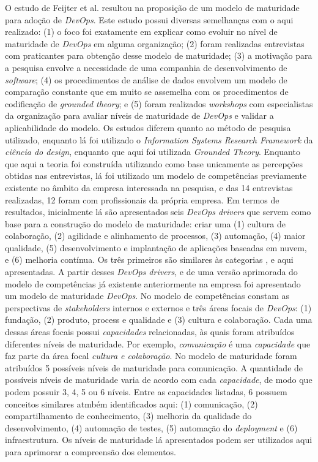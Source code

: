 O estudo de Feijter et al. \cite{feijter2017towards} resultou na proposição de
um modelo de maturidade para adoção de {\it DevOps}. Este estudo possui diversas
semelhanças com o aqui realizado: (1) o foco foi exatamente em explicar como evoluir
no nível de maturidade de {\it DevOps} em alguma organização; (2) foram realizadas
entrevistas com praticantes para obtenção desse modelo de maturidade; (3) a motivação
para a pesquisa envolve a necessidade de uma companhia de desenvolvimento de
{\it software}; (4) os procedimentos de análise de dados envolvem um modelo de
comparação constante que em muito se assemelha com os procedimentos de codificação
de {\it grounded theory}; e (5) foram realizados {\it workshops} com especialistas
da organização para avaliar níveis de maturidade de {\it DevOps} e validar
a aplicabilidade do modelo. Os estudos diferem quanto ao método de pesquisa
utilizado, enquanto lá foi utilizado o {\it Information Systems Research
Framework} da \emph{ciência do design}, enquanto que aqui foi utilizada
{\it Grounded Theory}. Enquanto que aqui a teoria foi construída utilizando
como base unicamente as percepções obtidas nas entrevistas, lá foi utilizado
um modelo de competências previamente existente no âmbito da empresa interessada
na pesquisa, e das 14 entrevistas realizadas, 12 foram com profissionais da
própria empresa. Em termos de resultados, inicialmente lá são apresentados seis
{\it DevOps drivers} que servem como base para a construção do modelo de
maturidade: criar uma (1) cultura de colaboração, (2) agilidade e alinhamento
de processos, (3) automação, (4) maior qualidade, (5) desenvolvimento e
implantação de aplicações baseadas em nuvem, e (6) melhoria contínua. Os três
primeiros são similares às categorias , 
e  aqui apresentadas. A partir desses {\it DevOps drivers}, e
de uma versão aprimorada do modelo de competências já existente anteriormente
na empresa foi apresentado um modelo de maturidade {\it DevOps}. No modelo
de competências constam as perspectivas de {\it stakeholders} internos e
externos e três áreas focais de {\it DevOps}: (1) fundação, (2) produto,
process e qualidade e (3) cultura e colaboração. Cada uma dessas áreas focais
possui \emph{capacidades} relacionadas, às quais foram atribuídos diferentes
níveis de maturidade. Por exemplo, \emph{comunicação} é uma \emph{capacidade}
que faz parte da área focal \emph{cultura e colaboração}. No modelo de
maturidade foram atribuídos 5 possíveis níveis de maturidade para comunicação.
A quantidade de possíveis níveis de maturidade varia de acordo com cada
\emph{capacidade}, de modo que podem possuir 3, 4, 5 ou 6 níveis. Entre as
capacidades listadas, 6 possuem conceitos similares atmbém identificados aqui:
(1) comunicação, (2) compartilhamento de conhecimento, (3) melhoria da qualidade
do desenvolvimento, (4) automação de testes, (5) automação do {\it deployment} e
(6) infraestrutura. Os níveis de maturidade lá apresentados podem ser utilizados
aqui para aprimorar a compreensão dos elementos.

